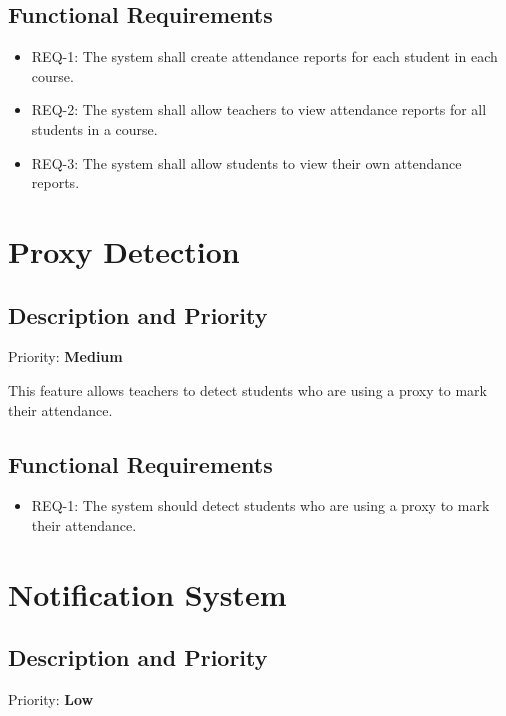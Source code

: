 \documentclass{scrreprt}
\begin{document}
\subsection{Functional Requirements}
\begin{itemize}
    \item REQ-1: The system shall create attendance reports for each student in each course.
    \item REQ-2: The system shall allow teachers to view attendance reports for all students in a course.
    \item REQ-3: The system shall allow students to view their own attendance reports.
\end{itemize}


\section{Proxy Detection}
\subsection{Description and Priority}
Priority: \textbf{Medium}

This feature allows teachers to detect students who are using a proxy to mark their attendance.

\subsection{Functional Requirements}
\begin{itemize}
    \item REQ-1: The system should detect students who are using a proxy to mark their attendance.
\end{itemize}

\section{Notification System}
\subsection{Description and Priority}
Priority: \textbf{Low}
\end{document}

